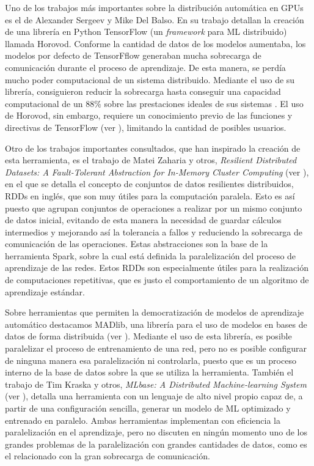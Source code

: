 \vspace{10pt}
Uno de los trabajos más importantes sobre la distribución automática en GPUs es el de Alexander Sergeev y Mike Del 
Balso. En su trabajo detallan la creación de una librería en Python TensorFlow (un \textit{framework} para ML 
distribuido) llamada Horovod. Conforme la cantidad de datos de los modelos aumentaba, los modelos por defecto de 
TensorFflow generaban mucha sobrecarga de comunicación durante el proceso de aprendizaje. De esta manera, se perdía 
mucho poder computacional de un sistema distribuido. Mediante el uso de su librería, consiguieron reducir la 
sobrecarga hasta conseguir una capacidad computacional de un 88\% sobre las prestaciones ideales de sus sistemas 
\cite{horovod}. El uso de Horovod, sin embargo, requiere un conocimiento previo de las funciones y directivas de 
TensorFlow (ver \cite{tensorflow}), limitando la cantidad de posibles usuarios.

\vspace{10pt}
Otro de los trabajos importantes consultados, que han inspirado la creación de esta herramienta, es el trabajo de 
Matei Zaharia y otros, 
\textit{Resilient Distributed Datasets: A Fault-Tolerant Abstraction for In-Memory Cluster Computing} (ver 
\cite{rdds}), en el que se detalla el concepto de conjuntos de datos resilientes distribuidos, RDDs en inglés, que son 
muy útiles para la computación paralela. Esto es así puesto que agrupan conjuntos de operaciones a realizar por un mismo
conjunto de datos inicial, evitando de esta manera la necesidad de guardar cálculos intermedios y mejorando así la 
tolerancia a fallos y reduciendo la sobrecarga de comunicación de las operaciones. Estas abstracciones son la base de la 
herramienta Spark, sobre la cual está definida la paralelización del proceso de aprendizaje de las redes. Estos RDDs son 
especialmente útiles para la realización de computaciones repetitivas, que es justo el comportamiento de un algoritmo de 
aprendizaje estándar.

\vspace{10pt}
Sobre herramientas que permiten la democratización de modelos de aprendizaje automático destacamos MADlib, una librería
para el uso de modelos en bases de datos de forma distribuida (ver \cite{hellerstein2012madlibanalyticslibrarymad}). 
Mediante el uso de esta librería, es posible paralelizar el proceso de entrenamiento de una red, pero no es posible
configurar de ninguna manera esa paralelización ni controlarla, puesto que es un proceso interno de la base de datos
sobre la que se utiliza la herramienta. También el trabajo de Tim Kraska y otros, 
\textit{MLbase: A Distributed Machine-learning System} (ver \cite{Kraska2013MLbaseAD}), detalla una herramienta con un 
lenguaje de alto nivel propio capaz de, a partir de una configuración sencilla, generar un modelo de ML optimizado y 
entrenado en paralelo. Ambas herramientas implementan con eficiencia la paralelización en el aprendizaje, pero no
discuten en ningún momento uno de los grandes problemas de la paralelización con grandes cantidades de datos, como es 
el relacionado con la gran sobrecarga de comunicación.

